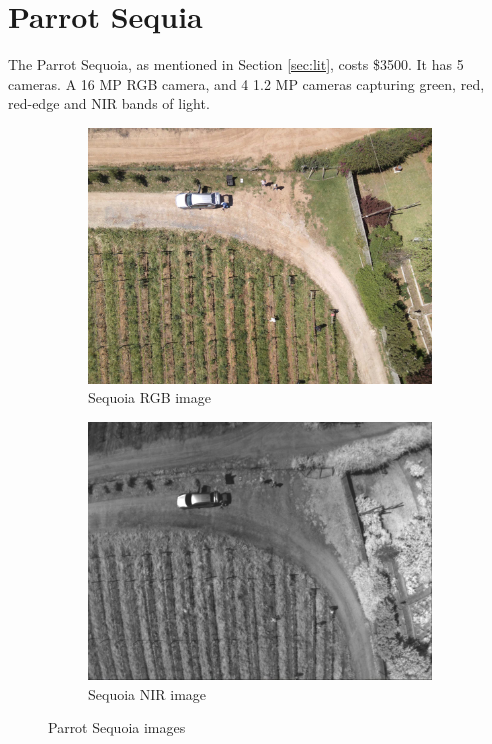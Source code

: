 \section{Parrot Sequia}

The Parrot Sequoia, as mentioned in Section \ref{sec:lit}, costs \$3500. It has 5 cameras. A 16 MP RGB camera, and 4 1.2 MP cameras capturing green, red, red-edge and NIR bands of light.

\begin{figure}[H]
\begin{subfigure}{0.5\textwidth}
\centering
\includegraphics[scale=0.11]{images/sequoia_rgb.jpg}
\caption{Sequoia RGB image}
\end{subfigure}
\begin{subfigure}{0.5\textwidth}
\centering
\includegraphics[scale=0.2]{images/sequoia_nir.jpg}
\caption{Sequoia NIR image}
\end{subfigure}
\caption{Parrot Sequoia images}
\label{fig:sequoia}
\end{figure}

